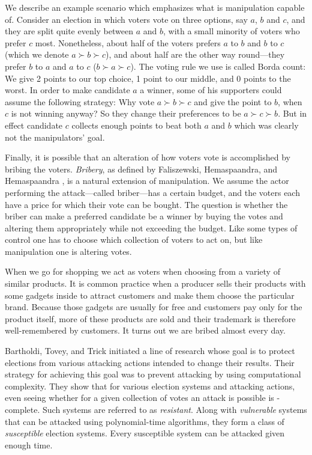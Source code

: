 We describe an example scenario which emphasizes what is manipulation capable of.
Consider an election in which voters vote on three options, say $a$, $b$ and $c$, and they are split quite evenly between $a$ and $b$, with a small minority of voters who prefer $c$ most.
Nonetheless, about half of the voters prefers $a$ to $b$ and $b$ to $c$ (which we denote $a\succ b\succ c$), and about half are the other way round---they prefer $b$ to $a$ and $a$ to $c$ ($b\succ a\succ c$).
The voting rule we use is called Borda count: We give 2 points to our top choice, 1 point to our middle, and 0 points to the worst.
In order to make candidate $a$ a winner, some of his supporters could assume the following strategy: Why vote $a\succ b\succ c$ and give
the point to $b$, when $c$ is not winning anyway?
So they change their preferences to be $a\succ c\succ b$.
But in effect candidate $c$ collects enough points to beat both $a$ and $b$ which was clearly not the manipulators' goal.

Finally, it is possible that an alteration of how voters vote is accomplished by bribing the voters.
\emph{Bribery}, as defined by Faliszewski, Hemaspaandra, and Hemaspaandra \cite{faliszewski9}, is a natural extension of manipulation.
We assume the actor performing the attack---called briber---has a certain budget, and the voters each have a price for which their vote can be bought.
The question is whether the briber can make a preferred candidate be a winner by buying the votes and altering them appropriately while not exceeding the budget.
Like some types of control one has to choose which collection of voters to act on, but like manipulation one is altering votes.

When we go for shopping we act as voters when choosing from a variety of similar products.
It is common practice when a producer sells their products with some gadgets inside to attract customers and make them choose the particular brand.
Because those gadgets are usually for free and customers pay only for the product itself, more of these products are sold and their trademark is therefore well-remembered by customers.
It turns out we are bribed almost every day.

Bartholdi, Tovey, and Trick \cite{bartholdi2,bartholdi3} initiated a line of research whose goal is to protect elections from various attacking actions intended to change their results.
Their strategy for achieving this goal was to prevent attacking by using computational complexity.
They show that for various election systems and attacking actions, even seeing whether for a given collection of votes an attack is possible is \NPclass-complete.
Such systems are referred to as \emph{resistant}.
Along with \emph{vulnerable} systems that can be attacked using polynomial-time algorithms, they form a class of \emph{susceptible} election systems.
Every susceptible system can be attacked given enough time.

